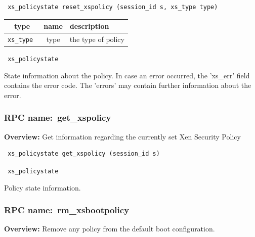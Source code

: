 \begin{verbatim} xs_policystate reset_xspolicy (session_id s, xs_type type)
\end{verbatim}


\vspace{0.3cm}

\begin{tabular}{|c|c|p{7cm}|}
 \hline
{\bf type} & {\bf name} & {\bf description} \\ \hline
{\tt xs\_type } & type & the type of policy \\ \hline

\end{tabular}

\vspace{0.3cm}


{\tt
xs\_policystate
}


State information about the policy. In case an error occurred, the 'xs\_err'
field contains the error code. The 'errors' may contain further information
about the error.
\vspace{0.3cm}
\vspace{0.3cm}
\vspace{0.3cm}
\subsubsection{RPC name:~get\_xspolicy}

{\bf Overview:}
Get information regarding the currently set Xen Security Policy

\begin{verbatim} xs_policystate get_xspolicy (session_id s)\end{verbatim}

\vspace{0.3cm}

{\tt
xs\_policystate
}


Policy state information.
\vspace{0.3cm}
\vspace{0.3cm}
\vspace{0.3cm}
\subsubsection{RPC name:~rm\_xsbootpolicy}

{\bf Overview:}
Remove any policy from the default boot configuration.

